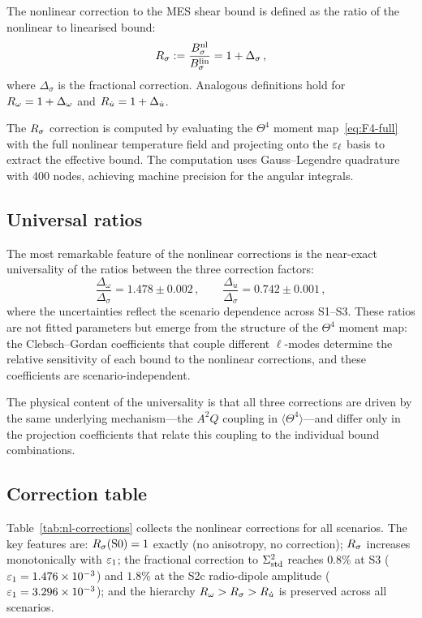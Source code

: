 The nonlinear correction to the MES shear bound is defined as
the ratio of the nonlinear to linearised bound:
\begin{equation}\label{eq:Rsig-def}
R_\sigma := \frac{B_\sigma^{\mathrm{nl}}}{B_\sigma^{\mathrm{lin}}}
= 1 + \Delta_\sigma\,,
\end{equation}
where $\Delta_\sigma$ is the fractional correction.  Analogous
definitions hold for $R_\omega = 1 + \Delta_\omega$ and
$R_{\dot{u}} = 1 + \Delta_{\dot{u}}$.

The $R_\sigma$ correction is computed by evaluating the $\Theta^4$
moment map~\eqref{eq:F4-full} with the full nonlinear
temperature field and projecting onto the $\varepsilon_\ell$ basis to
extract the effective bound.  The computation uses
Gauss--Legendre quadrature with 400 nodes, achieving machine
precision for the angular integrals.


\subsection{Universal ratios}\label{sec:universal}

The most remarkable feature of the nonlinear corrections is the
near-exact universality of the ratios between the three
correction factors:
\begin{equation}\label{eq:universal-ratios}
\frac{\Delta_\omega}{\Delta_\sigma}
= 1.478 \pm 0.002\,,\qquad
\frac{\Delta_{\dot{u}}}{\Delta_\sigma}
= 0.742 \pm 0.001\,,
\end{equation}
where the uncertainties reflect the scenario dependence across
S1--S3.  These ratios are not fitted parameters but emerge from
the structure of the $\Theta^4$ moment map: the Clebsch--Gordan
coefficients that couple different $\ell$-modes determine the
relative sensitivity of each bound to the nonlinear corrections,
and these coefficients are scenario-independent.

The physical content of the universality is that all three
corrections are driven by the same underlying mechanism---the
$A^2 Q$ coupling in $\langle\Theta^4\rangle$---and differ only
in the projection coefficients that relate this coupling to the
individual bound combinations.


\subsection{Correction table}\label{sec:correction-table}

Table~\ref{tab:nl-corrections} collects the nonlinear
corrections for all scenarios.  The key features are:
$R_\sigma(\mathrm{S0}) = 1$ exactly (no anisotropy, no
correction); $R_\sigma$ increases monotonically with $\varepsilon_1$;
the fractional correction to $\Sigma^2_{\mathrm{std}}$ reaches $0.8\%$ at S3
($\varepsilon_1 = 1.476 \times 10^{-3}$) and $1.8\%$ at the S2c
radio-dipole amplitude ($\varepsilon_1 = 3.296 \times 10^{-3}$);
and the hierarchy $R_\omega > R_\sigma > R_{\dot{u}}$ is preserved across all
scenarios.

